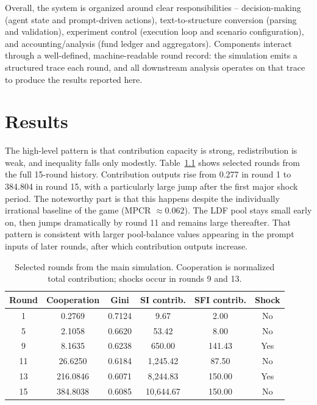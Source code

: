 \documentclass[12pt,letterpaper]{report}
\begin{document}
Overall, the system is organized around clear responsibilities -- decision-making (agent state and prompt-driven actions), text-to-structure conversion (parsing and validation), experiment control (execution loop and scenario configuration), and accounting/analysis (fund ledger and aggregators). Components interact through a well-defined, machine-readable round record: the simulation emits a structured trace each round, and all downstream analysis operates on that trace to produce the results reported here.

\chapter{Results}

The high-level pattern is that contribution capacity is strong, redistribution is weak, and inequality falls only modestly. Table~\ref{tab:macro_selected} shows selected rounds from the full 15-round history. Contribution outputs rise from 0.277 in round 1 to 384.804 in round 15, with a particularly large jump after the first major shock period. The noteworthy part is that this happens despite the individually irrational baseline of the game (MPCR $\approx 0.062$). The LDF pool stays small early on, then jumps dramatically by round 11 and remains large thereafter. That pattern is consistent with larger pool-balance values appearing in the prompt inputs of later rounds, after which contribution outputs increase.

\begin{table}[H]
\centering
\small
\begin{tabular}{cccccc}
\toprule
Round & Cooperation & Gini & SI contrib. & SFI contrib. & Shock \\
\midrule
1  & 0.2769   & 0.7124 & 9.67      & 2.00   & No \\
5  & 2.1058   & 0.6620 & 53.42     & 8.00   & No \\
9  & 8.1635   & 0.6238 & 650.00    & 141.43 & Yes \\
11 & 26.6250  & 0.6184 & 1,245.42  & 87.50  & No \\
13 & 216.0846 & 0.6071 & 8,244.83  & 150.00 & Yes \\
15 & 384.8038 & 0.6085 & 10,644.67 & 150.00 & No \\
\bottomrule
\end{tabular}
\caption{Selected rounds from the main simulation. Cooperation is normalized total contribution; shocks occur in rounds 9 and 13.}
\label{tab:macro_selected}
\end{table}
\end{document}

